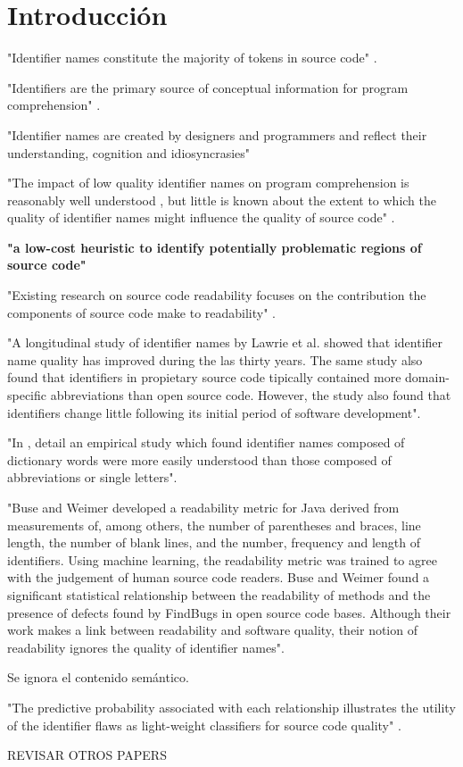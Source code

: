 \section{Introducción}

"Identifier names constitute the majority of tokens in source code" \cite{DeiBenbockPizka05}.

"Identifiers are the primary source of conceptual information for program
comprehension" \cite{RajlichWilde02}.

"Identifier names are created by designers and programmers and reflect their
understanding, cognition and idiosyncrasies" \cite{HostOstvold07}

"The impact of low quality identifier names on program comprehension is reasonably
well understood \cite{DeiBenbockPizka05,Lawrie2007,Lawrie2006}, but little is known
about the extent to which the quality of identifier names might influence the quality
of source code" \cite{ButlerWemelingerYu10}.

\textbf{"a low-cost heuristic to identify potentially problematic regions of source code"}

"Existing research on source code readability focuses on the contribution the
components of source code make to readability" \cite{Buse2008}.

"A longitudinal study of identifier names by Lawrie et al. \cite{Lawrie2007} showed that
identifier name quality has improved during the las thirty years. 
The same study also found
that identifiers in propietary source code tipically contained more domain-specific
abbreviations than open source code.
However, the study also found that identifiers change little following its initial period
of software development".

"In \cite{Lawrie2006}, detail an empirical study which found identifier names composed
of dictionary words were more easily understood than those composed of abbreviations
or single letters".

"Buse and Weimer \cite{Buse2008} developed a readability metric for Java derived from measurements 
of, among others, the number of parentheses and braces, line length, the number
of blank lines, and the number, frequency and length of identifiers.
Using machine learning, the readability metric was trained to agree with the judgement 
of human source code readers.
Buse and Weimer found a significant statistical relationship between the readability of 
methods and the presence of defects found by FindBugs in open source code bases. 
Although their work makes a link between readability and software quality, their notion
of readability ignores the quality of identifier names".

Se ignora el contenido semántico.

"The predictive probability associated with each relationship illustrates the utility
of the identifier flaws as light-weight classifiers for source code quality"
\cite{ButlerWemelingerYu10}.

REVISAR OTROS PAPERS

